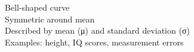 \documentclass[preview]{standalone}
\begin{document}
Bell-shaped curve\\Symmetric around mean\\Described by mean (μ) and standard deviation (σ)\\Examples: height, IQ scores, measurement errors\\
\end{document}
